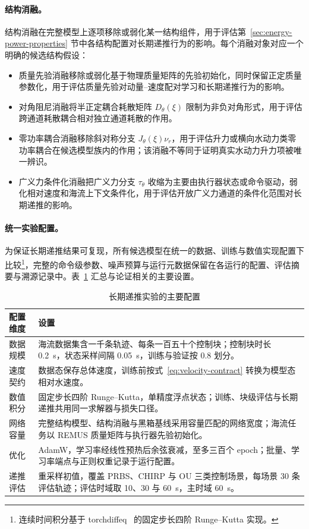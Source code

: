 \paragraph{结构消融。}结构消融在完整模型上逐项移除或弱化某一结构组件，用于评估第~\ref{sec:energy-power-properties} 节中各结构配置对长期递推行为的影响。每个消融对象对应一个明确的候选结构假设：

\begin{itemize}
  \item 质量先验消融移除或弱化基于物理质量矩阵的先验初始化，同时保留正定质量参数化，用于评估质量先验对动量--速度配对学习和长期递推行为的影响。
  \item 对角阻尼消融将半正定耦合耗散矩阵 \(D_\theta(\xi)\) 限制为非负对角形式，用于评估跨通道耗散耦合相对独立通道耗散的作用。
  \item 零功率耦合消融移除斜对称分支 \(J_\theta(\xi)\nu_r\)，用于评估升力或横向水动力类零功率耦合在候选模型族内的作用；该消融不等同于证明真实水动力升力项被唯一辨识。
  \item 广义力条件化消融把广义力分支 \(\tau_\theta\) 收缩为主要由执行器状态或命令驱动，弱化相对速度和海流上下文条件化，用于评估开放广义力通道的条件化范围对长期递推的影响。
\end{itemize}

\paragraph{统一实验配置。}为保证长期递推结果可复现，所有候选模型在统一的数据、训练与数值实现配置下比较\footnote{连续时间积分基于 torchdiffeq~\citep{chen2018neuralode} 的固定步长四阶 Runge--Kutta 实现。}，完整的命令级参数、噪声预算与运行元数据保留在各运行的配置、评估摘要与溯源记录中。表~\ref{tab:experimental-config} 汇总与论证相关的主要设置。

\begin{table}[htbp]
  \centering
  \caption{长期递推实验的主要配置}
  \label{tab:experimental-config}
  \begin{tabularx}{\textwidth}{>{\raggedright\arraybackslash}p{}>{\raggedright\arraybackslash}X}
    \toprule
    配置维度 & 设置 \\
    \midrule
    数据规模 & 海流数据集含一千条轨迹、每条一百五十个控制块；控制块时长 0.2~s，状态采样间隔 0.05~s，训练与验证按 \(0.8\) 划分。 \\
    速度契约 & 数据态保存总体速度，训练前按式~\eqref{eq:velocity-contract} 转换为模型态相对水速度。 \\
    数值积分 & 固定步长四阶 Runge--Kutta，单精度浮点状态；训练、块级评估与长期递推共用同一求解器与损失口径。 \\
    网络容量 & 完整结构模型、结构消融与黑箱基线采用容量匹配的网络宽度；海流任务以 REMUS 质量矩阵与执行器先验初始化。 \\
    优化 & AdamW，学习率经线性预热后余弦衰减，至多三百个 epoch；批量、学习率端点与正则权重记录于运行配置。 \\
    递推评估 & 重采样初值，覆盖 PRBS、CHIRP 与 OU 三类控制场景，每场景 30 条评估轨迹；评估时域取 10、30 与 60~s，主时域 60~s。 \\
    \bottomrule
  \end{tabularx}
\end{table}


